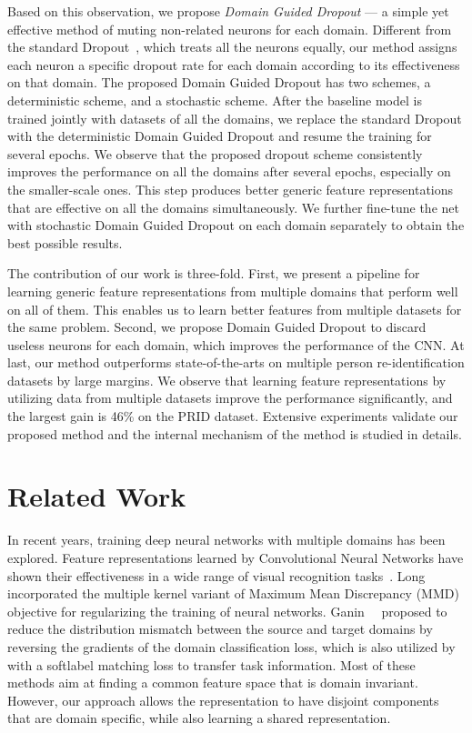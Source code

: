 Based on this observation, we propose \emph{Domain Guided Dropout} --- a simple yet effective method of muting non-related neurons for each domain. Different from the standard Dropout~\cite{hinton2012improving}, which treats all the neurons equally, our method assigns each neuron a specific dropout rate for each domain according to its effectiveness on that domain. The proposed Domain Guided Dropout has two schemes, a deterministic scheme, and a stochastic scheme. After the baseline model is trained jointly with datasets of all the domains, we replace the standard Dropout with the deterministic Domain Guided Dropout and resume the training for several epochs. We observe that the proposed dropout scheme consistently improves the performance on all the domains after several epochs, especially on the smaller-scale ones. This step produces better generic feature representations that are effective on all the domains simultaneously. We further fine-tune the net with stochastic Domain Guided Dropout on each domain separately to obtain the best possible results.

The contribution of our work is three-fold. First, we present a pipeline for learning generic feature representations from multiple domains that perform well on all of them. This enables us to learn better features from multiple datasets for the same problem. Second, we propose Domain Guided Dropout to discard useless neurons for each domain, which improves the performance of the CNN. At last, our method outperforms state-of-the-arts on multiple person re-identification datasets by large margins. We observe that learning feature representations by utilizing data from multiple datasets improve the performance significantly, and the largest gain is 46\% on the PRID dataset. Extensive experiments validate our proposed method and the internal mechanism of the method is studied in details.



\section{Related Work} %
\label{sec:related_work}

In recent years, training deep neural networks with multiple domains has been explored. Feature representations learned by Convolutional Neural Networks have shown their effectiveness in a wide range of visual recognition tasks~\cite{krizhevsky2012imagenet,girshick2014rich,long2014fully,chu2016structure,yang2016end,kang2016object}. Long~\etal~\cite{long2015learning} incorporated the multiple kernel variant of Maximum Mean Discrepancy (MMD) objective for regularizing the training of neural networks. Ganin~\etal~\cite{ganin2014unsupervised} proposed to reduce the distribution mismatch between the source and target domains by reversing the gradients of the domain classification loss, which is also utilized by~\cite{tzeng2015simultaneous} with a softlabel matching loss to transfer task information. Most of these methods aim at finding a common feature space that is domain invariant. However, our approach allows the representation to have disjoint components that are domain specific, while also learning a shared representation.

